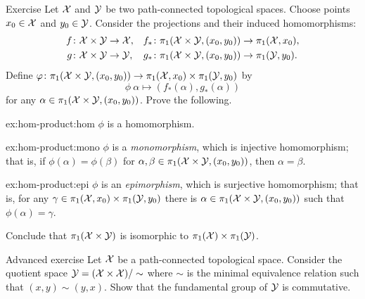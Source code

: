 \begin{thm}{Exercise}\label{ex:hom-product}
Let $\mathcal{X}$ and $\mathcal{Y}$ be two path-connected topological spaces.
Choose points $x_0\in \mathcal{X}$ and $y_0\in \mathcal{Y}$.
Consider the projections and their induced homomorphisms:
\begin{align*}
f\colon\mathcal{X}\times\mathcal{Y}&\to \mathcal{X},
&
f_*\colon\pi_1(\mathcal{X}\times\mathcal{Y},(x_0,y_0))&\to \pi_1(\mathcal{X},x_0),
\\
g\colon\mathcal{X}\times\mathcal{Y}&\to \mathcal{Y},
&
g_*\colon\pi_1(\mathcal{X}\times\mathcal{Y},(x_0,y_0))&\to \pi_1(\mathcal{Y},y_0).
\end{align*}
Define $\varphi\colon\pi_1(\mathcal{X}\times\mathcal{Y},(x_0,y_0))\to \pi_1(\mathcal{X},x_0)\times \pi_1(\mathcal{Y},y_0)$ by
\[\phi\:\alpha\mapsto (f_*(\alpha),g_*(\alpha))\]
for any $\alpha\in \pi_1(\mathcal{X}\times\mathcal{Y},(x_0,y_0))$.
Prove the following.

\begin{subthm}{ex:hom-product:hom}
$\phi$ is a homomorphism.
\end{subthm}


\begin{subthm}{ex:hom-product:mono}
$\phi$ is a \emph{monomorphism}, which is injective homomorphism;
that is, if $\phi(\alpha)=\phi(\beta)$ for $\alpha,\beta\z\in \pi_1(\c{X}\times\c{Y},(x_0,y_0))$, then
$\alpha=\beta$.
\end{subthm}

\begin{subthm}{ex:hom-product:epi}
$\phi$ is an \emph{epimorphism}, which is surjective homomorphism;
that is, for any $\gamma\in \pi_1(\c{X},x_0)\z\times\pi_1(\c{Y},y_0)$ there is $\alpha\in\pi_1(\mathcal{X}\times\mathcal{Y},(x_0,y_0))$ such that $\phi(\alpha)=\gamma$.
\end{subthm}

Conclude that $\pi_1(\mathcal{X}\times\mathcal{Y})$ is isomorphic to $\pi_1(\mathcal{X})\times\pi_1(\mathcal{Y})$.

\end{thm}

\begin{thm}{Advanced exercise}\label{ex:sim-product}
Let $\mathcal{X}$ be a path-connected topological space.
Consider the quotient space $\mathcal{Y}=(\mathcal{X}\times \mathcal{X})/\sim$ where $\sim$ is the minimal equivalence relation such that $(x,y)\sim (y,x)$.
Show that the fundamental group of $\mathcal{Y}$ is commutative.
\end{thm}

